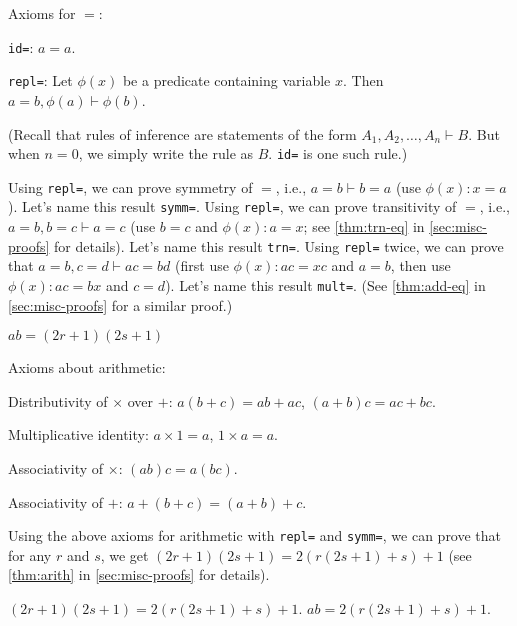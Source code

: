 Axioms for $=$:
\begin{tightemize}
\item \texttt{id=}: $a = a$.
\item \texttt{repl=}: Let $\phi(x)$ be a predicate containing variable $x$.
Then $a = b, \phi(a) \vdash \phi(b)$.
\end{tightemize}
(Recall that rules of inference are statements of the form $A_1, A_2, \ldots, A_n \vdash B$.
But when $n = 0$, we simply write the rule as $B$. \texttt{id=} is one such rule.)

Using \texttt{repl=}, we can prove symmetry of $=$, i.e.,
$a = b \vdash b = a$ (use $\phi(x): x = a$).
Let's name this result \texttt{symm=}.
Using \texttt{repl=}, we can prove transitivity of $=$, i.e.,
$a = b, b = c \vdash a = c$ (use $b = c$ and $\phi(x): a = x$;
see \cref{thm:trn-eq} in \cref{sec:misc-proofs} for details).
Let's name this result \texttt{trn=}.
Using \texttt{repl=} twice, we can prove that $a = b, c = d \vdash ac = bd$
(first use $\phi(x): ac = xc$ and $a = b$, then use $\phi(x): ac = bx$ and $c = d$).
Let's name this result \texttt{mult=}.
(See \cref{thm:add-eq} in \cref{sec:misc-proofs} for a similar proof.)

\begin{formalproof}
\State \label{p1:abeq}$ab = (2r + 1)(2s + 1)$
\end{formalproof}

Axioms about arithmetic:
\begin{tightemize}
\item Distributivity of $\times$ over $+$: $a(b+c) = ab + ac$, $(a+b)c = ac + bc$.
\item Multiplicative identity: $a \times 1 = a$, $1 \times a = a$.
\item Associativity of $\times$: $(ab)c = a(bc)$.
\item Associativity of $+$: $a + (b + c) = (a + b) + c$.
\end{tightemize}

Using the above axioms for arithmetic with \texttt{repl=} and \texttt{symm=},
we can prove that for any $r$ and $s$, we get $(2r+1)(2s+1) = 2(r(2s+1)+s) + 1$
(see \cref{thm:arith} in \cref{sec:misc-proofs} for details).

\begin{formalproof}
\State \label{p1:abeq2}$(2r+1)(2s+1) = 2(r(2s+1)+s) + 1$.
\State \label{p1:abeq3}$ab = 2(r(2s+1)+s) + 1$.
\end{formalproof}

